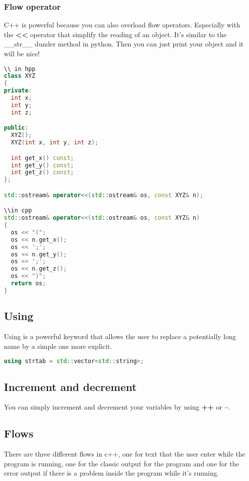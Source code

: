 \documentclass[a4paper, 12pt, titlepage]{scrartcl} %
\begin{document}
\subsubsection{Flow operator}
C++ is powerful because you can also overload flow operators. Especially with the \textbf{<<} operator that simplify the reading of an object. It's similar to the \_\_str\_\_ dunder method in python. Then you can just print your object and it will be nice!

\vspace{5mm}

\begin{lstlisting}[language=C++]
\\ in hpp
class XYZ
{
private:
  int x;
  int y;
  int z;

public:
  XYZ();
  XYZ(int x, int y, int z);

  int get_x() const;
  int get_y() const;
  int get_z() const;
};

std::ostream& operator<<(std::ostream& os, const XYZ& n);

\\in cpp
std::ostream& operator<<(std::ostream& os, const XYZ& n)
{
  os << "(";
  os << n.get_x();
  os << ';';
  os << n.get_y();
  os << ';';
  os << n.get_z();
  os << ")";
  return os;
}
\end{lstlisting} \vspace{5mm}

\subsection{Using}
Using is a powerful keyword that allows the user to replace a potentially long name by a simple one more explicit.

\begin{lstlisting}[language=C++]
using strtab = std::vector<std::string>;
\end{lstlisting} \vspace{5mm}

\subsection{Increment and decrement}
You can simply increment and decrement your variables by using \textbf{++} or \textbf{--}.

\subsection{Flows}
There are three different flows in c++, one for text that the user enter while the program is running, one for the classic output for the program and one for the error output if there is a problem inside the program while it's running.
\end{document}
